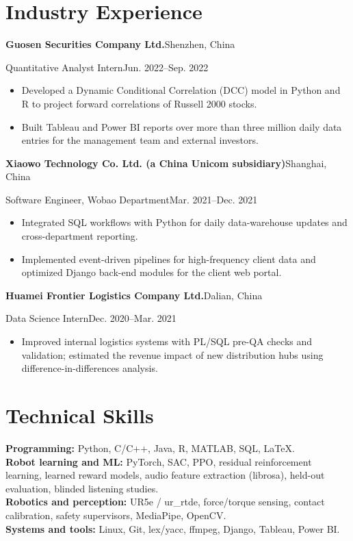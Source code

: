 \documentclass[10pt,letterpaper]{article}
\newcommand{\entry}[2]{\textbf{#1}\hfill #2\par}
\newcommand{\subentry}[2]{\vspace{4pt}\textbf{#1}\hfill #2\par}
\begin{document}
\section{Industry Experience}
\entry{Guosen Securities Company Ltd.}{Shenzhen, China}
Quantitative Analyst Intern\hfill Jun. 2022--Sep. 2022
\begin{itemize}
\item Developed a Dynamic Conditional Correlation (DCC) model in Python and R to project forward correlations of Russell 2000 stocks.
\item Built Tableau and Power BI reports over more than three million daily data entries for the management team and external investors.
\end{itemize}
\subentry{Xiaowo Technology Co. Ltd. (a China Unicom subsidiary)}{Shanghai, China}
Software Engineer, Wobao Department\hfill Mar. 2021--Dec. 2021
\begin{itemize}
\item Integrated SQL workflows with Python for daily data-warehouse updates and cross-department reporting.
\item Implemented event-driven pipelines for high-frequency client data and optimized Django back-end modules for the client web portal.
\end{itemize}
\subentry{Huamei Frontier Logistics Company Ltd.}{Dalian, China}
Data Science Intern\hfill Dec. 2020--Mar. 2021
\begin{itemize}
\item Improved internal logistics systems with PL/SQL pre-QA checks and validation; estimated the revenue impact of new distribution hubs using difference-in-differences analysis.
\end{itemize}
\section{Technical Skills}
\textbf{Programming:} Python, C/C++, Java, R, MATLAB, SQL, \LaTeX.\\[4pt]
\textbf{Robot learning and ML:} PyTorch, SAC, PPO, residual reinforcement learning, learned reward models, audio feature extraction (librosa), held-out evaluation, blinded listening studies.\\[4pt]
\textbf{Robotics and perception:} UR5e / ur\_rtde, force/torque sensing, contact calibration, safety supervisors, MediaPipe, OpenCV.\\[4pt]
\textbf{Systems and tools:} Linux, Git, lex/yacc, ffmpeg, Django, Tableau, Power BI.
\end{document}
